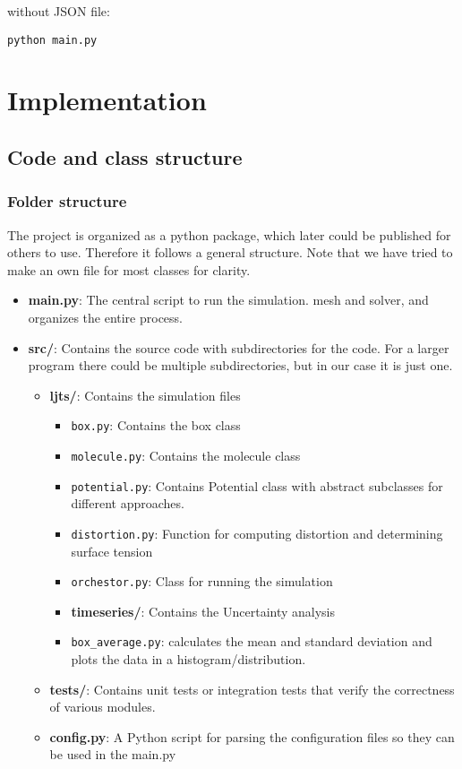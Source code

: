 \documentclass{article}
\begin{document}
without JSON file:

\begin{verbatim}
python main.py
\end{verbatim}


\section{Implementation}

\subsection*{Code and class structure}

\subsubsection*{Folder structure}

The project is organized as a python package, which later could be published for others to use. Therefore it follows a general structure. Note that we have tried to make an own file for most classes for clarity.

\begin{itemize}
    \item \textbf{main.py}: The central script to run the simulation.
    mesh and solver, and organizes the entire process.
    \item \textbf{src/}: Contains the source code with subdirectories for the code. For a larger program there could be multiple subdirectories, but in our case it is just one.
    \begin{itemize}
        \item \textbf{ljts/}: Contains the simulation files
        \begin{itemize}
            \item \texttt{box.py}: Contains the box class 
            \item \texttt{molecule.py}: Contains the molecule class
            \item \texttt{potential.py}: Contains Potential class with abstract subclasses for different approaches.
            \item \texttt{distortion.py}: Function for computing distortion and determining surface tension
            \item \texttt{orchestor.py}: Class for running the simulation
        \item \textbf{timeseries/}: Contains the Uncertainty analysis
            \item \texttt{box_average.py}: calculates the mean and standard deviation and plots the data in a histogram/distribution.
    \end{itemize}
    \item \textbf{tests/}: Contains unit tests or integration tests
    that verify the correctness of various modules.
    \item \textbf{config.py}: A Python script for parsing the configuration files so they can be used in the main.py
\end{itemize}
\end{itemize}
\end{document}
